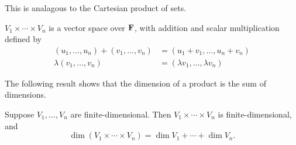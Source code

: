 \begin{remark}
This is analagous to the Cartesian product of sets.
\end{remark}

\begin{proposition}
$V_1\times\cdots\times V_n$ is a vector space over $\mathbf F$, with addition and scalar multiplication defined by
\begin{align*}
(u_1,\dots,u_n)+(v_1,\dots,v_n)&=(u_1+v_1,\dots,u_n+v_n)\\
\lambda(v_1,\dots,v_n)&=(\lambda v_1,\dots,\lambda v_n)
\end{align*}
\end{proposition}

The following result shows that the dimension of a product is the sum of dimensions.

\begin{proposition}
Suppose $V_1,\dots,V_n$ are finite-dimensional. Then $V_1\times\cdots\times V_n$ is finite-dimensional, and
\[\dim(V_1\times\cdots\times V_n)=\dim V_1+\cdots+\dim V_n.\]
\end{proposition}

